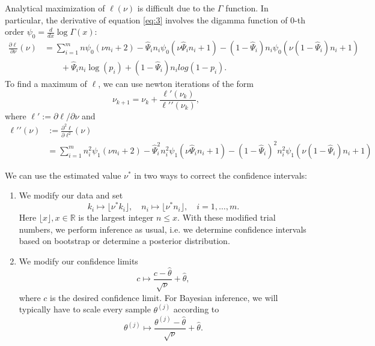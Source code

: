 \documentclass[a4paper,11pt]{scrartcl}
\def\p{\partial}
\begin{document}
Analytical maximization of $\ell ( \nu)$ is difficult due to the $\Gamma$ function.
In particular, the derivative of equation \eqref{eq:3} involves the digamma function of 0-th order $\psi_0 = \frac{d}{dx} \log\Gamma(x)$:
%
\begin{equation}
    \begin{split}
        \frac{\p\ell}{\p \nu} (\nu) &= \sum_{i=1}^m n\psi_0 ( \nu n_i + 2 )
            - \hat{\Psi}_i n_i \psi_0 ( \nu \hat{\Psi}_i n_i + 1)
            - (1-\hat{\Psi}_i) n_i \psi_0 ( \nu (1-\hat{\Psi}_i) n_i + 1) \\
            &\qquad + \hat{\Psi}_i n_i \log (p_i) + (1-\hat{\Psi}_i) n_i log (1-p_i).
    \end{split}
    \label{eq:4}
\end{equation}
%
To find a maximum of $\ell$, we can use newton iterations of the form
%
$$
\nu_{k+1} = \nu_{k} + \frac{\ell\prime(\nu_k)}{\ell\prime\prime(\nu_k)},
$$
%
where $\ell\prime := \p\ell/\p\nu$ and
%
\begin{equation}
    \begin{split}
        \ell\prime\prime ( \nu ) &:= \frac{\p^2\ell}{\p\ell^2} ( \nu) \\
        &= \sum_{i=1}^m n_i^2 \psi_1 ( \nu n_i + 2 ) - \hat{\Psi}_i^2 n_i^2 \psi_1 ( \nu \hat{\Psi}_i n_i + 1 ) - (1-\hat{\Psi}_i)^2 n_i^2 \psi_1 ( \nu (1-\hat{\Psi}_i) n_i + 1 )
    \end{split}
    \label{eq:5}
\end{equation}

We can use the estimated value $\nu^*$ in two ways to correct the confidence intervals:
%
\begin{enumerate}
    \item We modify our data and set
        $$
        k_i\mapsto \lfloor\nu^* k_i\rfloor,\quad n_i\mapsto \lfloor\nu^* n_i\rfloor,\quad i=1,\dots,m.
        $$
        Here $\lfloor x\rfloor, x\in\mathbb{R}$ is the largest integer $n\leq x$.
        With these modified trial numbers, we perform inference as usual, i.e. we determine confidence intervals based on bootstrap or determine
        a posterior distribution.
    \item We modify our confidence limits
        $$
        c \mapsto \frac{c-\hat{\theta}}{\sqrt{\nu}} + \hat{\theta},
        $$
        where $c$ is the desired confidence limit.
        For Bayesian inference, we will typically have to scale every sample $\theta^{(j)}$ according to
        $$
        \theta^{(j)} \mapsto \frac{\theta^{(j)} - \hat{\theta}}{\sqrt{\nu}} + \hat{\theta}.
        $$
\end{enumerate}
\end{document}
